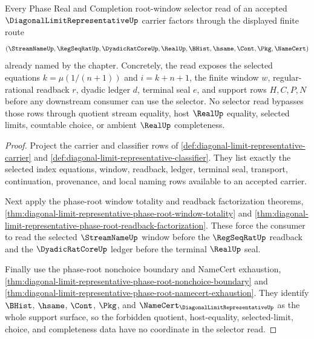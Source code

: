 \begin{theorem}
\label{thm:diagonal-limit-representative-root-window-selector-lock}
Every Phase Real and Completion root-window selector read of an accepted $\DiagonalLimitRepresentativeUp$ carrier factors through the displayed finite route
$$
(\StreamNameUp,\RegSeqRatUp,\DyadicRatCoreUp,\RealUp,\BHist,\hsame,\Cont,\Pkg,\NameCert)
$$
already named by the chapter. Concretely, the read exposes the selected equations $k=\mu(1/(n+1))$ and $i=k+n+1$, the finite window $w$, regular-rational readback $r$, dyadic ledger $d$, terminal seal $e$, and support rows $H,C,P,N$ before any downstream consumer can use the selector. No selector read bypasses those rows through quotient stream equality, host $\RealUp$ equality, selected limits, countable choice, or ambient $\RealUp$ completeness.
\end{theorem}
\begin{proof}
Project the carrier and classifier rows of \autoref{def:diagonal-limit-representative-carrier} and \autoref{def:diagonal-limit-representative-classifier}. They list exactly the selected index equations, window, readback, ledger, terminal seal, transport, continuation, provenance, and local naming rows available to an accepted carrier.

Next apply the phase-root window totality and readback factorization theorems, \autoref{thm:diagonal-limit-representative-phase-root-window-totality} and \autoref{thm:diagonal-limit-representative-phase-root-readback-factorization}. These force the consumer to read the selected $\StreamNameUp$ window before the $\RegSeqRatUp$ readback and the $\DyadicRatCoreUp$ ledger before the terminal $\RealUp$ seal.

Finally use the phase-root nonchoice boundary and NameCert exhaustion, \autoref{thm:diagonal-limit-representative-phase-root-nonchoice-boundary} and \autoref{thm:diagonal-limit-representative-phase-root-namecert-exhaustion}. They identify $\BHist$, $\hsame$, $\Cont$, $\Pkg$, and $\NameCert_{\DiagonalLimitRepresentativeUp}$ as the whole support surface, so the forbidden quotient, host-equality, selected-limit, choice, and completeness data have no coordinate in the selector read.
\end{proof}

